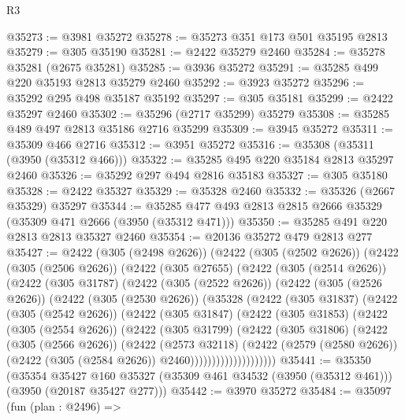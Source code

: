 \begin{lexlean}{R3}
\begin{coremodule}
@35273 := @3981 @35272
@35278 := @35273 @351 @173 @501 @35195 @2813
@35279 := @305 @35190
@35281 := @2422 @35279 @2460
@35284 := @35278 @35281 (@2675 @35281)
@35285 := @3936 @35272
@35291 := @35285 @499 @220 @35193 @2813 @35279 @2460
@35292 := @3923 @35272
@35296 := @35292 @295 @498 @35187 @35192
@35297 := @305 @35181
@35299 := @2422 @35297 @2460
@35302 := @35296 (@2717 @35299) @35279
@35308 := @35285 @489 @497 @2813 @35186 @2716 @35299
@35309 := @3945 @35272
@35311 := @35309 @466 @2716
@35312 := @3951 @35272
@35316 := @35308 (@35311 (@3950 (@35312 @466)))
@35322 := @35285 @495 @220 @35184 @2813 @35297 @2460
@35326 := @35292 @297 @494 @2816 @35183
@35327 := @305 @35180
@35328 := @2422 @35327
@35329 := @35328 @2460
@35332 := @35326 (@2667 @35329) @35297
@35344 := @35285 @477 @493 @2813 @2815 @2666 @35329 (@35309 @471 @2666 (@3950 (@35312 @471)))
@35350 := @35285 @491 @220 @2813 @2813 @35327 @2460
@35354 := @20136 @35272 @479 @2813 @277
@35427 := @2422
    (@305 (@2498 @2626))
    (@2422
      (@305 (@2502 @2626))
      (@2422
        (@305 (@2506 @2626))
        (@2422
          (@305 @27655)
          (@2422
            (@305 (@2514 @2626))
            (@2422
              (@305 @31787)
              (@2422
                (@305 (@2522 @2626))
                (@2422
                  (@305 (@2526 @2626))
                  (@2422
                    (@305 (@2530 @2626))
                    (@35328
                      (@2422
                        (@305 @31837)
                        (@2422
                          (@305 (@2542 @2626))
                          (@2422
                            (@305 @31847)
                            (@2422
                              (@305 @31853)
                              (@2422
                                (@305 (@2554 @2626))
                                (@2422
                                  (@305 @31799)
                                  (@2422
                                    (@305 @31806)
                                    (@2422
                                      (@305 (@2566 @2626))
                                      (@2422
                                        (@2573 @32118)
                                        (@2422
                                          (@2579 (@2580 @2626))
                                          (@2422 (@305 (@2584 @2626)) @2460))))))))))))))))))))
@35441 := @35350
    (@35354
      @35427
      @160
      @35327
      (@35309 @461 @34532 (@3950 (@35312 @461)))
      (@3950 (@20187 @35427 @277)))
@35442 := @3970 @35272
@35484 := @35097
    (fun (plan : @2496) =>

\end{coremodule}
\end{lexlean}
